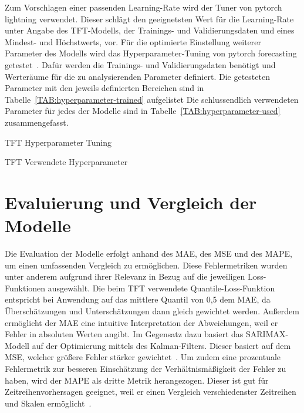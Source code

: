Zum Vorschlagen einer passenden Learning-Rate wird der Tuner von pytorch lightning verwendet.
Dieser schlägt den geeignetsten Wert für die Learning-Rate unter Angabe des \ac{TFT}-Modells, der Trainings- und Validierungsdaten und eines Mindest- und Höchstwerts, vor.
Für die optimierte Einstellung weiterer Parameter des Modells wird das Hyperparameter-Tuning von pytorch forecasting getestet~\cite{PytorchForecastingDocumentation.20230410T20:05:46.000Z}.
Dafür werden die Trainings- und Validierungsdaten benötigt und Werteräume für die zu analysierenden Parameter definiert.
Die getesteten Parameter mit den jeweils definierten Bereichen sind in Tabelle~\ref{TAB:hyperparameter-trained} aufgelistet
Die schlussendlich verwendeten Parameter für jedes der Modelle sind in Tabelle~\ref{TAB:hyperparameter-used} zusammengefasst.
\begin{table}[t]
 \centering\small
 \caption{TFT Hyperparameter Tuning}
 \label{TAB:hyperparameter-trained}
 
\end{table}

\begin{table}[t]
 \centering\small
 \caption{TFT Verwendete Hyperparameter}
 \label{TAB:hyperparameter-used}
 
\end{table}

\section{Evaluierung und Vergleich der Modelle}
Die Evaluation der Modelle erfolgt anhand des \ac{MAE}, des \ac{MSE} und des \ac{MAPE}, um einen umfassenden Vergleich zu ermöglichen.
Diese Fehlermetriken wurden unter anderem aufgrund ihrer Relevanz in Bezug auf die jeweiligen Loss-Funktionen ausgewählt.
Die beim \ac{TFT} verwendete Quantile-Loss-Funktion entspricht bei Anwendung auf das mittlere Quantil von 0,5 dem \ac{MAE}, da Überschätzungen und Unterschätzungen dann gleich gewichtet werden.
Außerdem ermöglicht der \ac{MAE} eine intuitive Interpretation der Abweichungen, weil er Fehler in absoluten Werten angibt.
Im Gegensatz dazu basiert das \ac{SARIMAX}-Modell auf der Optimierung mittels des Kalman-Filters.
Dieser basiert auf dem \ac{MSE}, welcher größere Fehler stärker gewichtet~\cite{Lacey.1998}.
Um zudem eine prozentuale Fehlermetrik zur besseren Einschätzung der Verhältnismäßigkeit der Fehler zu haben, wird der \ac{MAPE} als dritte Metrik herangezogen.
Dieser ist gut für Zeitreihenvorhersagen geeignet, weil er einen Vergleich verschiedenster Zeitreihen und Skalen ermöglicht~\cite{Lazzeri.2021}.

